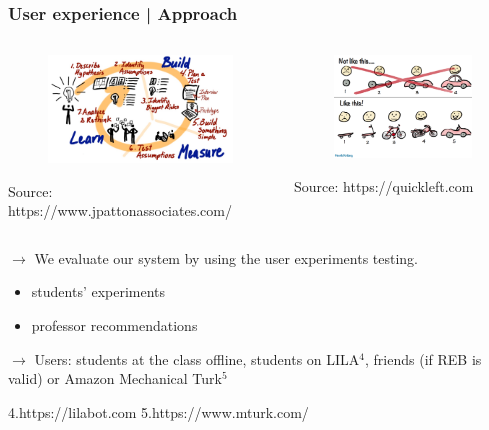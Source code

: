 \documentclass{beamer}
\begin{document}
\begin{frame}
\frametitle{User experience | Approach }


\begin{columns}[onlytextwidth]
	\begin{column}{.45\textwidth}
		\begin{figure}
			\includegraphics[width=\textwidth]{lsm}
		\end{figure}
		{\tiny 	Source: https://www.jpattonassociates.com/}
	\end{column}
	\hfill
	\begin{column}{.45\textwidth}
		\begin{figure}
			\includegraphics[width=.8\textwidth]{mvp}
		\end{figure}
		{\tiny 	Source: https://quickleft.com}
	\end{column}
\end{columns}

{\scriptsize  $\rightarrow$  We evaluate our system by using the user experiments testing. 
	\begin{itemize}
		\item students' experiments
		\item professor recommendations
	\end{itemize}
	$\rightarrow$ Users: students at the class offline, students on LILA$^4$, friends (if REB is valid) or Amazon Mechanical Turk$^5$}

\begin{flushleft}
	
	{\tiny 4.https://lilabot.com             }
	{\tiny 	 5.https://www.mturk.com/}
\end{flushleft}

\end{frame}
\end{document}
